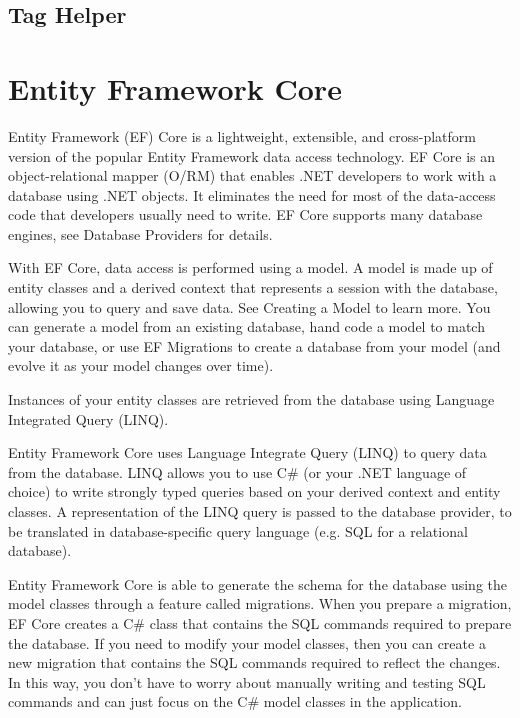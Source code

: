 \subsection{Tag Helper}

\section{Entity Framework Core}

Entity Framework (EF) Core is a lightweight, extensible, and cross-platform version of the popular Entity Framework data access technology.
EF Core is an object-relational mapper (O/RM) that enables .NET developers to work with a database using .NET objects. It eliminates the need for most of the data-access code that developers usually need to write. EF Core supports many database engines, see Database Providers for details. 

With EF Core, data access is performed using a model. A model is made up of entity classes and a derived context that represents a session with the database, allowing you to query and save data. See Creating a Model to learn more.
You can generate a model from an existing database, hand code a model to match your database, or use EF Migrations to create a database from your model (and evolve it as your model changes over time).

Instances of your entity classes are retrieved from the database using Language Integrated Query (LINQ). 

Entity Framework Core uses Language Integrate Query (LINQ) to query data from the database. LINQ allows you to use C\# (or your .NET language of choice) to write strongly typed queries based on your derived context and entity classes. A representation of the LINQ query is passed to the database provider, to be translated in database-specific query language (e.g. SQL for a relational database).\cite{msentitiyframework}


Entity Framework Core is able to generate the schema for the database using the model classes through
a feature called migrations. When you prepare a migration, EF Core creates a C\# class that contains the SQL commands required to prepare the database. If you need to modify your model classes, then you can create a new migration that contains the SQL commands required to reflect the changes. In this way, you don’t have to worry about manually writing and testing SQL commands and can just focus on the C\# model classes in the application.\cite{dotnetcore}

